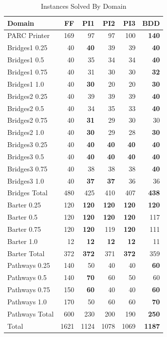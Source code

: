 \documentclass{article}
\begin{document}
\begin{table}																					
\begin{tabular}{|l|r|rrrr|}																						
\hline																						
Domain	&		FF		&		PI1		&		PI2		&		PI3		&		BDD		\\ \hline	\hline
PARC Printer &169&97&97&100&{\bf	140}	\\	\hline\hline
Bridges1 0.25 	&		40		&	{\bf	40}	&		39		&		39		&	{\bf	40}	\\	
Bridges1 0.5 	&		40		&		35		&		34		&		34		&	{\bf	40}	\\	
Bridges1 0.75 	&		40		&		31		&		30		&		30		&	{\bf	32}	\\	
Bridges1 1.0 	&		40		&	{\bf	30}	&		20		&		20		&	{\bf	30}	\\	
Bridges2 0.25 	&		40		&		39		&		39		&		39		&	{\bf	40}	\\	
Bridges2 0.5 	&		40		&		34		&		35		&		33		&	{\bf	40}	\\	
Bridges2 0.75 	&		40		&	{\bf	31}	&		29		&		30		&		30		\\	
Bridges2 1.0 	&		40		&	{\bf	30}	&		29		&		28		&	{\bf	30}	\\	
Bridges3 0.25 	&		40		&	{\bf	40}	&	{\bf	40}	&	{\bf	40}	&	{\bf	40}	\\	
Bridges3 0.5 	&		40		&	{\bf	40}	&	{\bf	40}	&	{\bf	40}	&	{\bf	40}	\\	
Bridges3 0.75 	&		40		&		38		&		38		&		38		&	{\bf	40}	\\	
Bridges3 1.0 	&		40		&	{\bf	37}	&	{\bf	37}	&		36		&		36		\\	\hline
Bridges Total 	&		480		&		425		&		410		&		407		&	{\bf	438}	\\	\hline\hline
Barter 0.25 	&		120		&	{\bf	120}	&	{\bf	120}	&	{\bf	120}	&	{\bf	120}	\\	
Barter 0.5 	&		120		&	{\bf	120}	&	{\bf	120}	&	{\bf	120}	&		117		\\	
Barter 0.75 	&		120		&	{\bf	120}	&		119		&	{\bf	120}	&		111		\\	
Barter 1.0 	&		12		&	{\bf	12}	&	{\bf	12}	&	{\bf	12}	&		11		\\	\hline
Barter Total 	&		372		&	{\bf	372}	&		371		&	{\bf	372}	&		359		\\	\hline\hline
Pathways 0.25 	&		140		&		50		&		40		&		40		&	{\bf	60}	\\	
Pathways 0.5 	&		140		&	{\bf	70}	&		60		&		50		&		60		\\	
Pathways 0.75 	&		150		&	{\bf	60}	&		40		&		40		&	{\bf	60}	\\	
Pathways 1.0 	&		170		&		50		&		60		&		60		&	{\bf	70}	\\	\hline
Pathways Total	&		600		&		230		&		200		&		190		&	{\bf	250}	\\	\hline\hline
Total	&		1621		&		1124		&		1078		&		1069		&	{\bf	1187}	\\	
\hline														
\end{tabular}	\caption{\label{tab:solved} Instances Solved By Domain}																					
\end{table}																									
								
\end{document}
